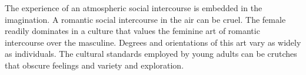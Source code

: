 

The experience of an atmospheric social intercourse is embedded in the
imagination.  A romantic social intercourse in the air can be cruel.
The female readily dominates in a culture that values the feminine art
of romantic intercourse over the masculine.  Degrees and orientations
of this art vary as widely as individuals.  The cultural standards
employed by young adults can be crutches that obscure feelings and
variety and exploration.

\bye
